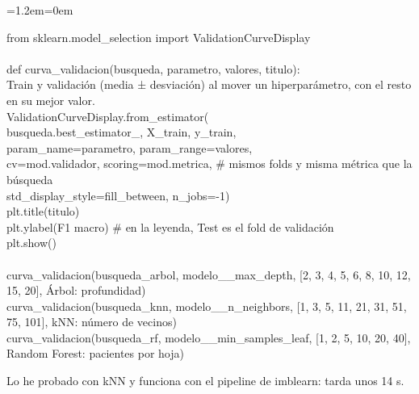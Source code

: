 \documentclass[11pt,a4paper]{article}
\newenvironment{codigo}
  {\par\smallskip\begin{list}{}{\leftmargin=1.2em\rightmargin=0em}\item\relax\ttfamily\scriptsize\raggedright}
  {\end{list}\smallskip}
\begin{document}
{\begin{codigo}
from sklearn.model\_\allowbreak{}selection import ValidationCurveDisplay \\{}
\mbox{} \\{}
def curva\_\allowbreak{}validacion(busqueda, parametro, valores, titulo): \\{}
\hspace*{2.08em}\textquotedbl{}\textquotedbl{}\textquotedbl{}Train y validación (media ± desviación) al mover un hiperparámetro, con el resto en su mejor valor.\textquotedbl{}\textquotedbl{}\textquotedbl{} \\{}
\hspace*{2.08em}ValidationCurveDisplay.from\_\allowbreak{}estimator( \\{}
\hspace*{4.16em}busqueda.best\_\allowbreak{}estimator\_\allowbreak{}, X\_\allowbreak{}train, y\_\allowbreak{}train, \\{}
\hspace*{4.16em}param\_\allowbreak{}name=parametro, param\_\allowbreak{}range=valores, \\{}
\hspace*{4.16em}cv=mod.validador, scoring=mod.metrica,      \# mismos folds y misma métrica que la búsqueda \\{}
\hspace*{4.16em}std\_\allowbreak{}display\_\allowbreak{}style=\textquotedbl{}fill\_\allowbreak{}between\textquotedbl{}, n\_\allowbreak{}jobs=-1) \\{}
\hspace*{2.08em}plt.title(titulo) \\{}
\hspace*{2.08em}plt.ylabel(\textquotedbl{}F1 macro\textquotedbl{})                         \# en la leyenda, \textquotedbl{}Test\textquotedbl{} es el fold de validación \\{}
\hspace*{2.08em}plt.show() \\{}
\mbox{} \\{}
curva\_\allowbreak{}validacion(busqueda\_\allowbreak{}arbol, \textquotedbl{}modelo\_\allowbreak{}\_\allowbreak{}max\_\allowbreak{}depth\textquotedbl{}, [2, 3, 4, 5, 6, 8, 10, 12, 15, 20], \textquotedbl{}Árbol: profundidad\textquotedbl{}) \\{}
curva\_\allowbreak{}validacion(busqueda\_\allowbreak{}knn, \textquotedbl{}modelo\_\allowbreak{}\_\allowbreak{}n\_\allowbreak{}neighbors\textquotedbl{}, [1, 3, 5, 11, 21, 31, 51, 75, 101], \textquotedbl{}kNN: número de vecinos\textquotedbl{}) \\{}
curva\_\allowbreak{}validacion(busqueda\_\allowbreak{}rf, \textquotedbl{}modelo\_\allowbreak{}\_\allowbreak{}min\_\allowbreak{}samples\_\allowbreak{}leaf\textquotedbl{}, [1, 2, 5, 10, 20, 40], \textquotedbl{}Random Forest: pacientes por hoja\textquotedbl{})
\end{codigo}
Lo he probado con kNN y funciona con el pipeline de imblearn: tarda unos 14 s.

}
\end{document}
